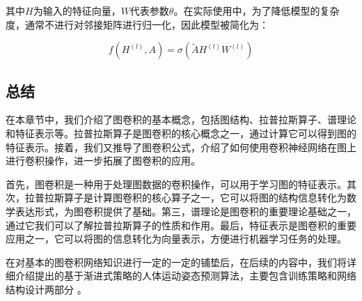 其中$H$为输入的特征向量，$W$代表参数$\theta$。在实际使用中，为了降低模型的复杂度，通常不进行对邻接矩阵进行归一化，因此模型被简化为：

\begin{equation}
    f(H^{(l)},A) = \sigma\left(\widetilde{A}H^{(l)}W^{(l)} \right)
\end{equation}


\subsection{总结}
在本章节中，我们介绍了图卷积的基本概念，包括图结构、拉普拉斯算子、谱理论和特征表示等。拉普拉斯算子是图卷积的核心概念之一，通过计算它可以得到图的特征表示。接着，我们又推导了图卷积公式，介绍了如何使用卷积神经网络在图上进行卷积操作，进一步拓展了图卷积的应用。

首先，图卷积是一种用于处理图数据的卷积操作，可以用于学习图的特征表示。其次，拉普拉斯算子是计算图卷积的核心算子之一，它可以将图的结构信息转化为数学表达形式，为图卷积提供了基础。第三，谱理论是图卷积的重要理论基础之一，通过它我们可以了解拉普拉斯算子的性质和作用。最后，特征表示是图卷积的重要应用之一，它可以将图的信息转化为向量表示，方便进行机器学习任务的处理。

在对基本的图卷积网络知识进行一定的一定的铺垫后，在后续的内容中，我们将详细介绍提出的基于渐进式策略的人体运动姿态预测算法，主要包含训练策略和网络结构设计两部分
。
